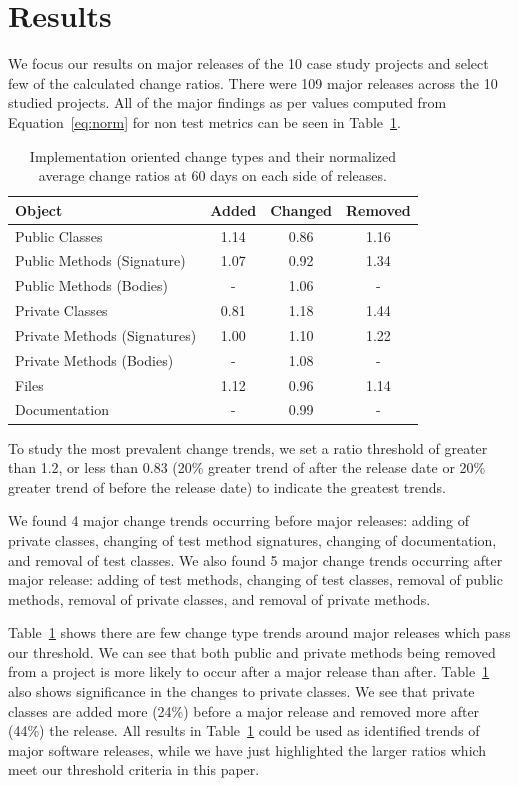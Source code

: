 \documentclass{sig-alternate}
\begin{document}
\section{Results}
\label{sec:results}

We focus our results on major releases of the 10 case study projects and select few of the calculated change ratios. 
There were 109 major releases across the 10 studied projects. All of the major findings as per values computed from Equation~\ref{eq:norm} for non test metrics
can be seen in Table~\ref{tab:ratio}.

\begin{table}[h]
\begin{center}
\caption{Implementation oriented change types and their normalized average change ratios at 60 days on each side of releases. \label{tab:ratio}}
\tabcolsep=0.11cm
\begin{tabular}{| l | c | c | c |}
\hline
Object & Added & Changed & Removed\\
\hline
Public Classes & 1.14 & 0.86 & 1.16 \\
Public Methods (Signature) & 1.07 & 0.92 & 1.34 \\
Public Methods (Bodies) & - & 1.06 & - \\
Private Classes & 0.81 & 1.18 & 1.44 \\
Private Methods (Signatures) & 1.00 & 1.10 & 1.22 \\
Private Methods (Bodies) & - & 1.08 & - \\
Files & 1.12 & 0.96 & 1.14 \\
Documentation & - & 0.99 & - \\
\hline
\end{tabular}
\end{center}
\end{table}

To study the most prevalent change trends, we set a ratio threshold of greater than 1.2, or less than 0.83 (20\% greater trend of after the release date
or 20\% greater trend of before the release date) to indicate the greatest trends.

We found 4 major change trends occurring before major releases: adding of private classes, changing of test method signatures, changing of documentation,
and removal of test classes.
We also found 5 major change trends occurring after major release: adding of test methods, changing of test classes, removal of public methods, removal
of private classes, and removal of private methods.

Table~\ref{tab:ratio} shows there are few change type trends around major releases which pass our threshold. We can see that both public
and private methods
being removed from a project is more likely to occur after a major release than after. Table~\ref{tab:ratio} also shows significance in the changes to private
classes. We see that private classes are added more (24\%) before a major release and removed more after (44\%) the release. 
All results in Table~\ref{tab:ratio} could be used as identified trends of major software releases, while we have just highlighted the larger ratios
which meet our threshold criteria in this paper.
\end{document}
